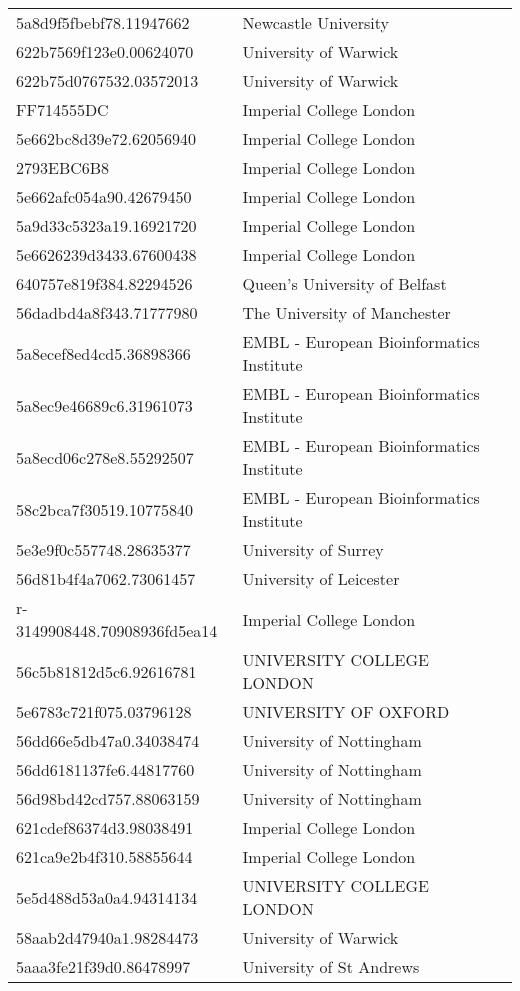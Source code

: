 \begin{tabular}{ll}
5a8d9f5fbebf78.11947662 & Newcastle University \\
622b7569f123e0.00624070 & University of Warwick \\
622b75d0767532.03572013 & University of Warwick \\
FF714555DC & Imperial College London \\
5e662bc8d39e72.62056940 & Imperial College London \\
2793EBC6B8 & Imperial College London \\
5e662afc054a90.42679450 & Imperial College London \\
5a9d33c5323a19.16921720 & Imperial College London \\
5e6626239d3433.67600438 & Imperial College London \\
640757e819f384.82294526 & Queen's University of Belfast \\
56dadbd4a8f343.71777980 & The University of Manchester \\
5a8ecef8ed4cd5.36898366 & EMBL - European Bioinformatics Institute \\
5a8ec9e46689c6.31961073 & EMBL - European Bioinformatics Institute \\
5a8ecd06c278e8.55292507 & EMBL - European Bioinformatics Institute \\
58c2bca7f30519.10775840 & EMBL - European Bioinformatics Institute \\
5e3e9f0c557748.28635377 & University of Surrey \\
56d81b4f4a7062.73061457 & University of Leicester \\
r-3149908448.70908936fd5ea14 & Imperial College London \\
56c5b81812d5c6.92616781 & UNIVERSITY COLLEGE LONDON \\
5e6783c721f075.03796128 & UNIVERSITY OF OXFORD \\
56dd66e5db47a0.34038474 & University of Nottingham \\
56dd6181137fe6.44817760 & University of Nottingham \\
56d98bd42cd757.88063159 & University of Nottingham \\
621cdef86374d3.98038491 & Imperial College London \\
621ca9e2b4f310.58855644 & Imperial College London \\
5e5d488d53a0a4.94314134 & UNIVERSITY COLLEGE LONDON \\
58aab2d47940a1.98284473 & University of Warwick \\
5aaa3fe21f39d0.86478997 & University of St Andrews \\

\end{tabular}
